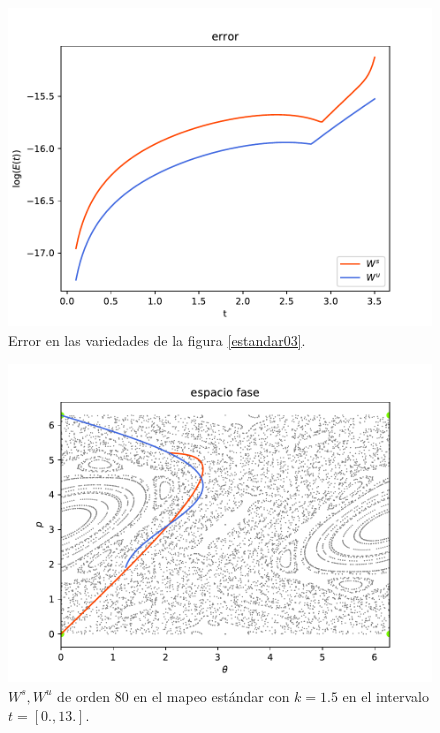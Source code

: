 \begin{figure}[H]
	\centering
	\includegraphics[scale=0.7]{errork03} 
	\caption{Error en las variedades de la figura \ref{estandar03}.}
	\label{error est k03}
\end{figure}


\begin{figure}[H]
	\centering
	\includegraphics[scale=0.7]{k15}
	\caption{$W^{s},W^{u}$ de orden $80$ en el mapeo estándar con $k=1.5$ en el intervalo $t=[0.,13.].$}
	\label{estandar15}
\end{figure}

